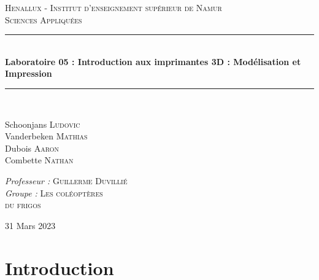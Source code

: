 \documentclass[12pt, letterpaper]{report}
\newcommand{\HRule}{\rule{\linewidth}{0.5mm}}
\begin{document}
\begin{titlepage}
  \begin{sffamily}
  \begin{center}


    \textsc{\LARGE Henallux - Institut d'enseignement supérieur de Namur}\\[2cm]

    \textsc{\Large Sciences Appliquées}\\[1.5cm]

    \HRule \\[0.4cm]
    \huge \bfseries {Laboratoire 05 : Introduction aux imprimantes 3D : Modélisation et Impression \\[0.4cm]}
    \HRule \\[2cm]

    \begin{minipage}{0.4\textwidth}
      \begin{flushleft} \large
        Schoonjans \textsc{Ludovic}\\
        Vanderbeken  \textsc{Mathias}\\
        Dubois  \textsc{Aaron}\\
        Combette  \textsc{Nathan}\\
      \end{flushleft}
    \end{minipage}
    \begin{minipage}{0.4\textwidth}
      \begin{flushright} \large
        \emph{Professeur :} \textsc{Guillerme Duvillié}\\
         \emph{Groupe :} \textsc{Les coléoptères \\du frigos}\\
      \end{flushright}
    \end{minipage}

    \vfill

 \large {31 Mars 2023}
  \end{center}
  \end{sffamily}
\end{titlepage}

\renewcommand*\contentsname{Contents}
\tableofcontents


\chapter*{Introduction}
\end{document}
